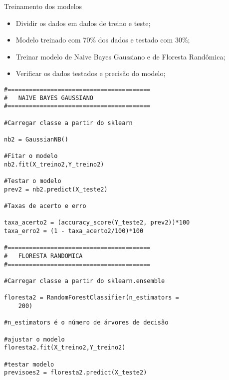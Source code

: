 \documentclass[compress]{beamer}
\begin{document}
\begin{frame}{Treinamento dos modelos}
\begin{itemize}
    \item Dividir os dados em dados de treino e teste;
    \item Modelo treinado com 70\% dos dados e testado com 30\%;
    \item Treinar modelo de Naive Bayes Gaussiano e de Floresta Randômica;
    \item Verificar os dados testados e precisão do modelo;
\end{itemize}
\end{frame}

\begin{verbatim}
#========================================
#   NAIVE BAYES GAUSSIANO
#========================================

#Carregar classe a partir do sklearn

nb2 = GaussianNB()

#Fitar o modelo
nb2.fit(X_treino2,Y_treino2)

#Testar o modelo
prev2 = nb2.predict(X_teste2)

#Taxas de acerto e erro

taxa_acerto2 = (accuracy_score(Y_teste2, prev2))*100
taxa_erro2 = (1 - taxa_acerto2/100)*100

#========================================
#   FLORESTA RANDOMICA
#========================================

#Carregar classe a partir do sklearn.ensemble

floresta2 = RandomForestClassifier(n_estimators =
    200)

#n_estimators é o número de árvores de decisão

#ajustar o modelo
floresta2.fit(X_treino2,Y_treino2)

#testar modelo
previsoes2 = floresta2.predict(X_teste2)


\end{verbatim}
\end{document}
